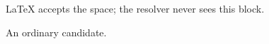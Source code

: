\documentclass{article}
\begin{document}
\begin {theorem}\label{thm:spaced}
LaTeX accepts the space; the resolver never sees this block.
\end {theorem}

\begin{theorem}\label{thm:seen}
An ordinary candidate.
\end{theorem}
\end{document}
